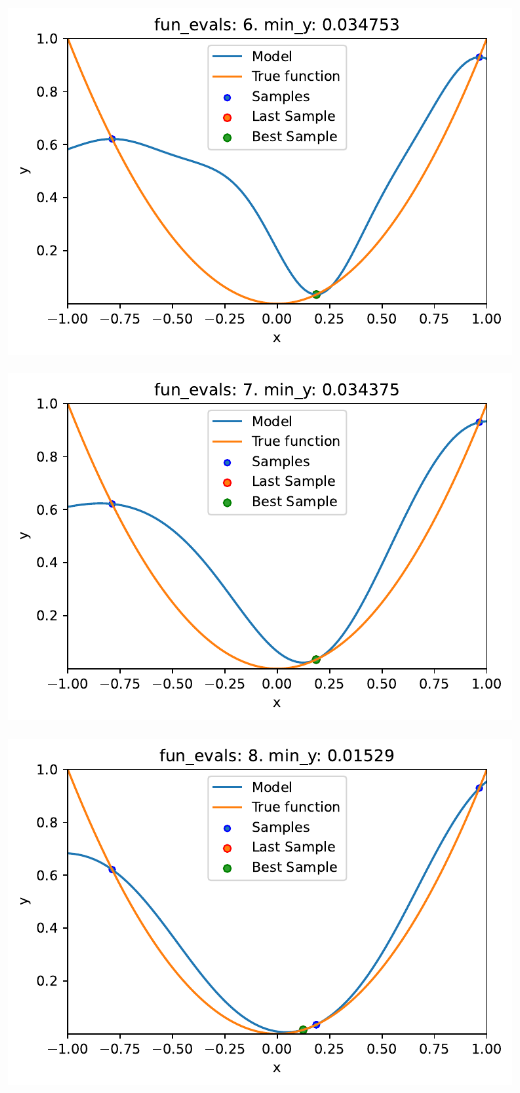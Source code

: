 \documentclass[
  letterpaper,
  DIV=11,
  numbers=noendperiod]{scrreprt}
\begin{document}
\includegraphics{010_num_spot_sklearn_surrogate_files/figure-pdf/cell-20-output-5.pdf}

\includegraphics{010_num_spot_sklearn_surrogate_files/figure-pdf/cell-20-output-6.pdf}

\includegraphics{010_num_spot_sklearn_surrogate_files/figure-pdf/cell-20-output-7.pdf}
\end{document}
